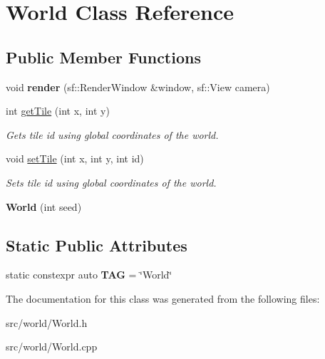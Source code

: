 \hypertarget{classWorld}{\section{World Class Reference}
\label{classWorld}
}
\subsection*{Public Member Functions}
\begin{DoxyCompactItemize}
\item 
\hypertarget{classWorld_ad41d823a21794ad47ac4478677b0ae7f}{void {\bfseries render} (sf\-::\-Render\-Window \&window, sf\-::\-View camera)}\label{classWorld_ad41d823a21794ad47ac4478677b0ae7f}

\item 
\hypertarget{classWorld_add11c876b51a55c267f6b30b72e3b741}{int \hyperlink{classWorld_add11c876b51a55c267f6b30b72e3b741}{get\-Tile} (int x, int y)}\label{classWorld_add11c876b51a55c267f6b30b72e3b741}

\begin{DoxyCompactList}\small\item\em Gets tile id using global coordinates of the world. \end{DoxyCompactList}\item 
\hypertarget{classWorld_a475311731cded97f05e81cb0f056a7ac}{void \hyperlink{classWorld_a475311731cded97f05e81cb0f056a7ac}{set\-Tile} (int x, int y, int id)}\label{classWorld_a475311731cded97f05e81cb0f056a7ac}

\begin{DoxyCompactList}\small\item\em Sets tile id using global coordinates of the world. \end{DoxyCompactList}\item 
\hypertarget{classWorld_a4598832293e050abba792d1b4367a368}{{\bfseries World} (int seed)}\label{classWorld_a4598832293e050abba792d1b4367a368}

\end{DoxyCompactItemize}
\subsection*{Static Public Attributes}
\begin{DoxyCompactItemize}
\item 
\hypertarget{classWorld_a9ebf0ccc9a330d5f3e4ed8401d64e5f6}{static constexpr auto {\bfseries T\-A\-G} = \char`\"{}World\char`\"{}}\label{classWorld_a9ebf0ccc9a330d5f3e4ed8401d64e5f6}

\end{DoxyCompactItemize}


The documentation for this class was generated from the following files\-:\begin{DoxyCompactItemize}
\item 
src/world/World.\-h\item 
src/world/World.\-cpp\end{DoxyCompactItemize}
